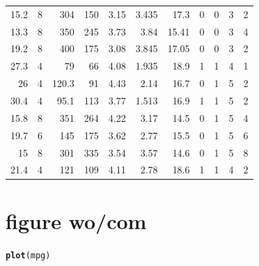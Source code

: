 \documentclass{article}\usepackage[]{graphicx}\usepackage[]{color}
\makeatletter
\newcommand{\hlstd}[1]{\textcolor[rgb]{0.345,0.345,0.345}{#1}}%
\newcommand{\hlkwd}[1]{\textcolor[rgb]{0.737,0.353,0.396}{\textbf{#1}}}%
\newenvironment{kframe}{%
 \def\at@end@of@kframe{}%
 \ifinner\ifhmode%
  \def\at@end@of@kframe{\end{minipage}}%
  \begin{minipage}{\columnwidth}%
 \fi\fi%
 \def\FrameCommand##1{\hskip\@totalleftmargin \hskip-\fboxsep
 \colorbox{shadecolor}{##1}\hskip-\fboxsep
     \hskip-\linewidth \hskip-\@totalleftmargin \hskip\columnwidth}%
 \MakeFramed {\advance\hsize-\width
   \@totalleftmargin\z@ \linewidth\hsize
   \@setminipage}}%
 {\par\unskip\endMakeFramed%
 \at@end@of@kframe}
\newenvironment{knitrout}{}{} %
\makeatother
\begin{document}
\begin{table}[ht]
\begin{center}
\begin{tabular}{rrrrrrrrrrr}
15.2 & 8 & 304 & 150 & 3.15 & 3.435 & 17.3 & 0 & 0 & 3 & 2 \\
13.3 & 8 & 350 & 245 & 3.73 & 3.84 & 15.41 & 0 & 0 & 3 & 4 \\
19.2 & 8 & 400 & 175 & 3.08 & 3.845 & 17.05 & 0 & 0 & 3 & 2 \\
27.3 & 4 & 79 & 66 & 4.08 & 1.935 & 18.9 & 1 & 1 & 4 & 1 \\
26 & 4 & 120.3 & 91 & 4.43 & 2.14 & 16.7 & 0 & 1 & 5 & 2 \\
30.4 & 4 & 95.1 & 113 & 3.77 & 1.513 & 16.9 & 1 & 1 & 5 & 2 \\
15.8 & 8 & 351 & 264 & 4.22 & 3.17 & 14.5 & 0 & 1 & 5 & 4 \\
19.7 & 6 & 145 & 175 & 3.62 & 2.77 & 15.5 & 0 & 1 & 5 & 6 \\
15 & 8 & 301 & 335 & 3.54 & 3.57 & 14.6 & 0 & 1 & 5 & 8 \\
21.4 & 4 & 121 & 109 & 4.11 & 2.78 & 18.6 & 1 & 1 & 4 & 2 \\
\hline
\end{tabular}
\end{center}
\end{table} 


\section{figure wo/com}

\blindtext

\begin{knitrout}
\color{fgcolor}\begin{kframe}
\begin{alltt}
\hlkwd{plot}\hlstd{(mpg)}
\end{alltt}


{\ttfamily\noindent\bfseries\color{errorcolor}{\#\# Error in plot(mpg): object 'mpg' not found}}\end{kframe}
\end{knitrout}
\end{document}
